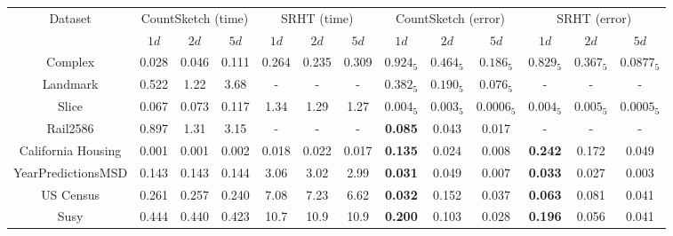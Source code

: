 \begin{table}[ht]
\centering
\begin{adjustbox}{width=1\textwidth}
\small

\begin{tabular}{|c|c|c|c|c|c|c||c|c|c|c|c|c|}
  \hline
\multirow{2}{*}{Dataset} & \multicolumn{3}{c|}{CountSketch (time)} & \multicolumn{3}{c||}{SRHT (time)} & \multicolumn{3}{c|}{CountSketch (error)} & \multicolumn{3}{c|}{SRHT (error)} \\
                        &     $1d$       &  $2d$            & $5d$          & $1d$          & $2d$        & $5d$         &     $1d$       &  $2d$          &   $5d$         &  $1d$          & $2d$         & $5d$  \\
\hline

Complex & 0.028 & 0.046 & 0.111 & 0.264 & 0.235 & 0.309 & $0.924_5$ & $0.464_5$ & $0.186_5$ & $0.829_5$ & $ 0.367_5$ & $0.0877_5$ \\

Landmark & 0.522 & 1.22 & 3.68 & - & - & - & $0.382_5$ & $0.190_5$ & $0.076_5$ & - & - & - \\

Slice &  0.067  &  0.073  &  0.117 &   1.34   & 1.29 & 1.27 &  $0.004_5$  &  $0.003_5$ &  $0.0006_5$ &   $0.004_5$ & $0.005_5$  &  $0.0005_5$  \\

Rail2586  & 0.897 & 1.31 & 3.15 & - & - & - & \textbf{0.085} & 0.043 & 0.017 & - & - & - \\

California Housing     &   0.001          &  0.001           &   0.002          & 0.018         &  0.022        & 0.017          &   \textbf{0.135}          &  0.024           & 0.008       & \textbf{0.242}          & 0.172         & 0.049 \\


YearPredictionsMSD      &    0.143         &   0.143          &  0.144          &  3.06         &  3.02        &   2.99        &  \textbf{0.031}           &   0.049          &    0.007           &   \textbf{0.033}        &   0.027        &  0.003         \\

US Census   & 0.261 & 0.257 & 0.240 & 7.08 & 7.23 & 6.62 & \textbf{0.032} &  0.152 & 0.037 & \textbf{0.063} & 0.081 & 0.041 \\

Susy  & 0.444 & 0.440 & 0.423 & 10.7 & 10.9 & 10.9 & \textbf{0.200} & 0.103 & 0.028 & \textbf{0.196} & 0.056 & 0.041 \\


\end{tabular}
\end{adjustbox}
\end{table}
